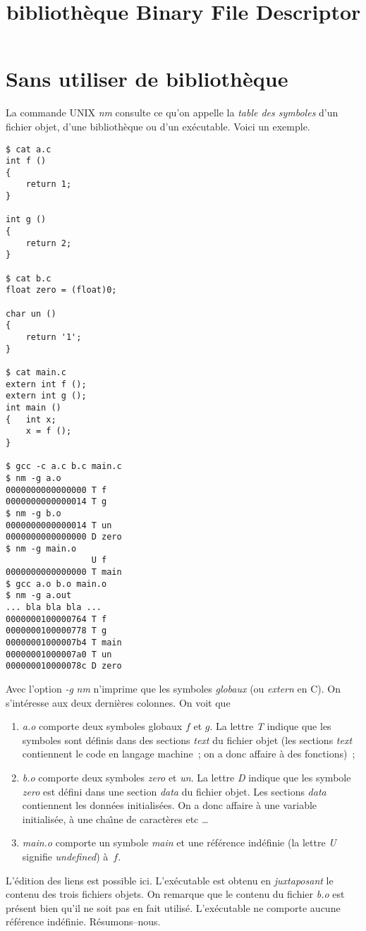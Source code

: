 \documentclass{article}
\title{biblioth\`eque Binary File Descriptor}
\begin{document}
\maketitle

\section{Sans utiliser de biblioth{\`e}que}

La commande UNIX {\em nm} consulte ce qu'on appelle la \emph{table des
symboles} d'un fichier objet, d'une biblioth{\`e}que ou d'un ex{\'e}cutable.
Voici un exemple.

\begin{verbatim}
$ cat a.c
int f ()
{
    return 1;
} 

int g ()
{
    return 2;
}

$ cat b.c
float zero = (float)0;

char un ()
{
    return '1';
}

$ cat main.c
extern int f ();
extern int g ();
int main ()
{   int x;
    x = f ();
}

$ gcc -c a.c b.c main.c
$ nm -g a.o
0000000000000000 T f
0000000000000014 T g
$ nm -g b.o
0000000000000014 T un
0000000000000000 D zero
$ nm -g main.o
                 U f
0000000000000000 T main
$ gcc a.o b.o main.o
$ nm -g a.out
... bla bla bla ...
0000000100000764 T f
0000000100000778 T g
00000001000007b4 T main
00000001000007a0 T un
000000010000078c D zero
\end{verbatim}

Avec l'option \emph{-g} {\em nm} n'imprime que les symboles \emph{globaux} 
(ou {\em extern} en C).
On s'int{\'e}resse aux deux derni{\`e}res colonnes.
On voit que 
\begin{enumerate}
\item	{\em a.o} comporte deux symboles globaux $f$ et $g$. La lettre {\em T}
	indique que les symboles sont d{\'e}finis dans des sections \emph{text} du 
	fichier objet (les sections \emph{text} contiennent le code en langage
	machine~; on a donc affaire {\`a} des fonctions)~;
\item	{\em b.o} comporte deux symboles {\em zero} et {\em un}. La lettre
	{\em D} indique que les symbole {\em zero} est d{\'e}fini dans une
	section \emph{data} du fichier objet. Les sections \emph{data}
	contiennent les donn{\'e}es initialis{\'e}es. On a donc affaire {\`a}
	une variable initialis{\'e}e, {\`a} une cha{\^\i}ne de caract{\`e}res etc \dots
\item 	{\em main.o} comporte un symbole {\em main} et une r{\'e}f{\'e}rence
	ind{\'e}finie (la lettre {\em U} signifie \emph{{\em undefined}}) {\`a}~$f$.
\end{enumerate}
L'{\'e}dition des liens est possible ici.
L'ex{\'e}cutable est obtenu en \emph{juxtaposant} le contenu des trois fichiers 
objets. On remarque que le contenu du fichier {\em b.o} est pr{\'e}sent bien 
qu'il ne soit pas en fait utilis{\'e}.
L'ex{\'e}cutable ne comporte aucune r{\'e}f{\'e}rence ind{\'e}finie. 
R{\'e}sumons--nous.
\end{document}
